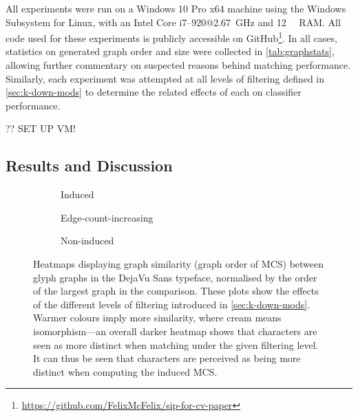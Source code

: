 \documentclass{mpaper}
\begin{document}
\noindent
All experiments were run on a Windows 10 Pro x64 machine using the Windows Subsystem for Linux, with an Intel Core i7--920@\SI{2.67}{\GHz} and \SI{12}{\gibi\byte} RAM.
All code used for these experiments is publicly accessible on GitHub\footnote{\url{https://github.com/FelixMcFelix/sip-for-cv-paper}}.
In all cases, statistics on generated graph order and size were collected in \cref{tab:graphstats}, allowing further commentary on suspected reasons behind matching performance.
Similarly, each experiment was attempted at all levels of filtering defined in \cref{sec:k-down-mods} to determine the related effects of each on classifier performance.


?? SET UP VM!

\subsection{Results and Discussion}


\begin{figure}
	\centering
	\begin{subfigure}[b]{0.3\linewidth}
		
		\caption{
			Induced
			\label{fig:heat:filter:induced}
		}
	\end{subfigure}
	\begin{subfigure}[b]{0.3\linewidth}
		
		\caption{
			Edge-count-increasing
			\label{fig:heat:filter:eci}
		}
	\end{subfigure}
	\begin{subfigure}[b]{0.3\linewidth}
		
		\caption{
			Non-induced
			\label{fig:heat:filter:non-ind}
		}
	\end{subfigure}

\vspace{0.5em}
\caption{
	Heatmaps displaying graph similarity (graph order of MCS) between glyph graphs in the DejaVu Sans typeface, normalised by the order of the largest graph in the comparison.
	These plots show the effects of the different levels of filtering introduced in \cref{sec:k-down-mods}.
	Warmer colours imply more similarity, where cream means isomorphism---an overall darker heatmap shows that characters are seen as more distinct when matching under the given filtering level.	
	It can thus be seen that characters are perceived as being more distinct when computing the  induced MCS.
	\label{fig:heat:filter}
}
\end{figure}
\end{document}
